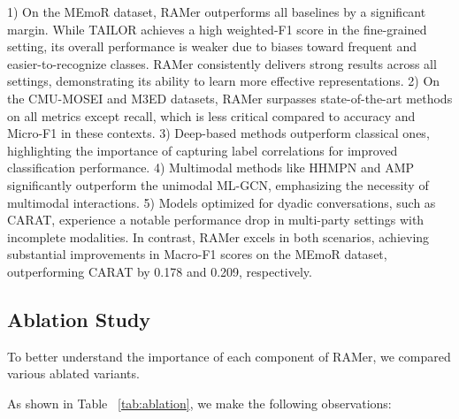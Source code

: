 1) On the MEmoR dataset, RAMer outperforms all baselines by a significant margin. While TAILOR achieves a high weighted-F1 score in the fine-grained setting, its overall performance is weaker due to biases toward frequent and easier-to-recognize classes. RAMer consistently delivers strong results across all settings, demonstrating its ability to learn more effective representations. 
2) On the CMU-MOSEI and M3ED datasets, RAMer surpasses state-of-the-art methods on all metrics except recall, which is less critical compared to accuracy and Micro-F1 in these contexts. 
3) Deep-based methods outperform classical ones, highlighting the importance of capturing label correlations for improved classification performance. 
4) Multimodal methods like HHMPN and AMP significantly outperform the unimodal ML-GCN, emphasizing the necessity of multimodal interactions.
5) Models optimized for dyadic conversations, such as CARAT, experience a notable performance drop in multi-party settings with incomplete modalities. In contrast, RAMer excels in both scenarios, achieving substantial improvements in Macro-F1 scores on the MEmoR dataset, outperforming CARAT by 0.178 and 0.209, respectively. 


\subsection{Ablation Study}
To better understand the importance of each component of RAMer, we compared various ablated variants. 

As shown in Table ~\ref{tab:ablation}, we make the following observations:

